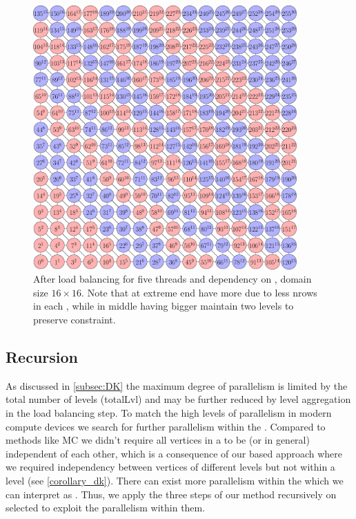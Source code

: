     
    \begin{figure}
      \begin{minipage}[c]{0.63\textwidth}
      	\includegraphics[height=0.26\textheight,width=0.9\textwidth]{pics/load_balancing/2d-7pt/stencil_2d_7pt}
      \end{minipage}\hfill
      \begin{minipage}[c]{0.34\textwidth}
      	\caption{After load balancing for five threads and \DTWO dependency on \stex, domain size $16 \times 16$. Note that \levelGroups at extreme end have more \levels due to less \acrshort{nrows} in each \level, while \levelGroups in middle having bigger \levels maintain two levels to preserve \DTWO constraint.
      	} \label{fig:2d_7pt_lb}
      \end{minipage}
     \end{figure}
     

	\subsection{Recursion}\label{subsec:REC}
As discussed in \cref{subsec:DK} the maximum degree of parallelism is limited by the total number of levels (\acrshort{totalLvl}) and may be further reduced by level aggregation in the load balancing step.  To match the high levels of parallelism in modern compute devices we search for further parallelism within the \levelGroups.  Compared to methods like \acrfull{MC} we didn't require all vertices in a \levelGroup to be \DONE (or \DK in general) independent of each other, which is a consequence of our \level based approach where we required \DK independency between vertices of different levels but not within a level (see \cref{corollary_dk}). There can exist more parallelism within the \levelGroups which we can interpret as \subgraphs.  Thus, we apply the three steps of our method recursively on selected \subgraphs to exploit the parallelism within them.  

